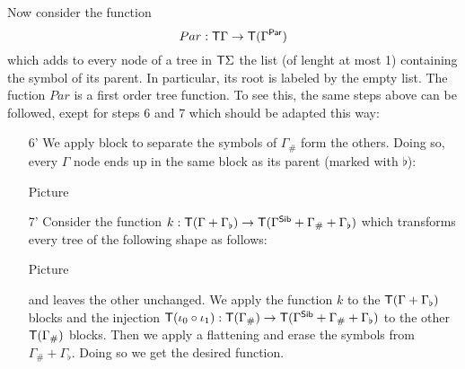 \begin{example}
\medskip
Now consider the function $$Par:\mathsf T\Gamma\to \mathsf T (\Gamma^{\sf{Par}})$$ which adds to every node of a tree in $\mathsf T \Sigma$ the list (of lenght at most 1) containing the symbol of its parent. In particular, its root is labeled by the empty list. 
The fuction $Par$ is a first order tree function. To see this, the same steps above can be followed, exept for steps 6 and 7 which should be adapted this way:
\begin{enumerate}
\item[6'] We apply block to separate the symbols of $\Gamma_\#$ form the others. Doing so, every $\Gamma$ node ends up in the same block as its parent (marked with $\flat$):
\begin{center}
Picture
\end{center}
\item[7'] Consider the function $k:\mathsf T(\Gamma+\Gamma_\flat)\to \mathsf T(\Gamma^{\sf{Sib}}+\Gamma_\#+\Gamma_\flat)$ which transforms every tree of the following shape as follows:
\begin{center}
Picture
\end{center}
and leaves the other unchanged. We apply the function $k$ to the $\mathsf T(\Gamma+\Gamma_\flat)$
blocks and the injection $\mathsf T (\iota_0\circ \iota_1):\mathsf T(\Gamma_\#)\to \mathsf T(\Gamma^{\sf{Sib}}+\Gamma_\#+\Gamma_\flat)$ to the other $\mathsf T(\Gamma_\#)$ blocks. Then we apply a flattening and erase the symbols from $\Gamma_\#+\Gamma_\flat$. Doing so we get the desired function.
\end{enumerate} 
\end{example}



